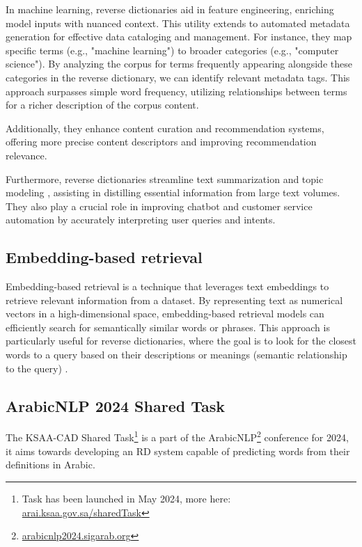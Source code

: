 \documentclass[12pt]{article}
\begin{document}
In machine learning, reverse dictionaries aid in feature engineering, enriching model inputs with nuanced context. This utility extends to automated metadata generation for effective data cataloging and management. For instance, they map specific terms (e.g., "machine learning") to broader categories (e.g., "computer science"). By analyzing the corpus for terms frequently appearing alongside these categories in the reverse dictionary, we can identify relevant metadata tags. This approach surpasses simple word frequency, utilizing relationships between terms for a richer description of the corpus content.

Additionally, they enhance content curation and recommendation systems, offering more precise content descriptors and improving recommendation relevance.

Furthermore, reverse dictionaries streamline text summarization and topic modeling \cite{Griffiths2004}, assisting in distilling essential information from large text volumes. They also play a crucial role in improving chatbot and customer service automation by accurately interpreting user queries and intents.

\subsection{Embedding-based retrieval}

Embedding-based retrieval is a technique that leverages text embeddings to retrieve relevant information from a dataset. By representing text as numerical vectors in a high-dimensional space, embedding-based retrieval models can efficiently search for semantically similar words or phrases. This approach is particularly useful for reverse dictionaries, where the goal is to look for the closest words to a query based on their descriptions or meanings (semantic relationship to the query) \cite{Huang2020}.

\subsection{ArabicNLP 2024 Shared Task}\label{sec:arabicnlp}

The KSAA-CAD Shared Task\footnote{Task has been launched in May 2024, more here: \href{https://arai.ksaa.gov.sa/sharedTask2024/}{arai.ksaa.gov.sa/sharedTask}} is a part of the ArabicNLP\footnote{\href{https://arabicnlp2024.sigarab.org/}{arabicnlp2024.sigarab.org}} conference for 2024, it aims towards developing an RD system capable of predicting words from their definitions in Arabic.
\end{document}
